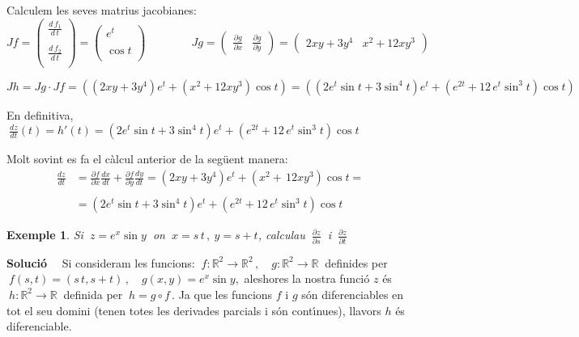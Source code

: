 \documentclass[12pt]{article}
\newcommand{\solucio}{\textbf{Soluci{\'o}}\ \ }
\newtheorem{exemple}{Exemple}[subsection]
\newcommand{\R}{\mathbb{R}}
\begin{document}
Calculem les seves matrius jacobianes:
\begin{equation*}
Jf=\left(\begin{array} {c}
  \displaystyle\frac{d\,f_1}{d\, t} \\
   \\
   \displaystyle\frac{d\, f_2}{d\, t} \\
   \end{array} \right)=\left(\begin{array} {c}
   e^t \\
   \\
   \cos t \\
   \end{array} \right)
   \qquad\qquad Jg=\left(\begin{array} {cc}
   \displaystyle\frac{\partial g}{\partial x} & \displaystyle\frac{\partial g}{\partial y}
\end{array} \right)=\left(\begin{array} {cc}
 2xy+3y^4  & x^2+12xy^3
\end{array} \right)
\end{equation*}


\begin{equation*}
Jh=Jg\cdot Jf = (
(2xy+3y^4)e^t+(x^2+12xy^3)\cos t)= ( (2e^t\sin
t+3\sin^4t)e^t+(e^{2t}+12\,e^t \sin^3t)\cos t)
\end{equation*}

En definitiva, $\ \displaystyle\frac{dz}{dt}(t)=h'(t)=(2e^t\sin
t+3\sin^4t)e^t+(e^{2t}+12\,e^t\sin^3t)\cos t$

\vspace{0.4cm}
Molt sovint es fa el c{\`a}lcul anterior de la seg{\"u}ent manera:
\begin{align*}
\frac{dz}{dt} & = \frac{\partial f}{\partial x} \frac{dx}{dt} +
\frac{\partial f}{\partial y} \frac{dy}{dt} =
(2xy+3y^4)e^t+(x^2+\,12xy^3)\cos t= \\
&\\ & = (2e^t\sin
t+3\sin^4t)e^t+(e^{2t}+12\,e^t\sin^3t)\cos t
\end{align*}

\vspace{0.4cm}
\begin{exemple}
Si $\ z=e^x \sin y\ $ on $\ x=s\, t\,,\ y=s + t$, calculau
$\ \displaystyle\frac{\partial z}{\partial s}\ $ i $\ \displaystyle\frac{\partial z}{\partial t}\,$
\end{exemple}

\solucio
Si consideram les funcions: $\ f:\R^2\longrightarrow \R^2\,,\quad g:\R^2\longrightarrow \R\ $ definides per $\ f(s,t)=(s\,t,s+ t)\,, \quad g(x,y)=e^x \sin y,$ aleshores la nostra funci{\'o} $z$ {\'e}s $\ h:\R^2\longrightarrow \R\ $ definida per $\ h=g\circ f\,.$ Ja que les funcions $f$ i $g$ s{\'o}n diferenciables en tot el seu domini (tenen totes les derivades parcials i s{\'o}n cont{\'\i}nues), llavors  $h$ {\'e}s diferenciable.
\end{document}
